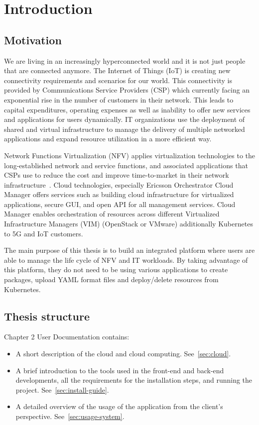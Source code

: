 \chapter{Introduction} %
\label{ch:intro}

\section{Motivation}
We are living in an increasingly hyperconnected world and it is not just people that are connected anymore. The Internet of Things (IoT) is creating new connectivity requirements and scenarios for our world. This connectivity is provided by Communications Service Providers (CSP) which currently facing an exponential rise in the number of customers in their network. This leads to capital expenditures, operating expenses as well as inability to offer new services and applications for users dynamically. IT organizations use the deployment of shared and virtual infrastructure to manage the delivery of multiple networked applications and expand resource utilization in a more efficient way.

Network Functions Virtualization (NFV) applies virtualization technologies to the long-established network and service functions, and associated applications that CSPs use to reduce the cost and improve time-to-market in their network infrastructure~\cite{nfv-for-dummies}. Cloud technologies, especially Ericsson Orchestrator Cloud Manager offers services such as building cloud infrastructure for virtualized applications, secure GUI, and open API for all management services. Cloud Manager enables orchestration of resources across different Virtualized Infrastructure Managers (VIM) (OpenStack or VMware) additionally Kubernetes to 5G and IoT customers.

The main purpose of this thesis is to build an integrated platform where users are able to manage the life cycle of NFV and IT workloads. By taking advantage of this platform, they do not need to be using various applications to create packages, upload YAML format files and deploy/delete resources from Kubernetes.

\section{Thesis structure}
Chapter 2 User Documentation contains:
\begin{itemize}
  \item A short description of the cloud and cloud computing. See~\autoref{sec:cloud}.
  \item A brief introduction to the tools used in the front-end and back-end developments, all the requirements for the installation steps, and running the project. See~\autoref{sec:install-guide}.
  \item A detailed overview of the usage of the application from the client's perspective. See~\autoref{sec:usage-system}.
\end{itemize}

